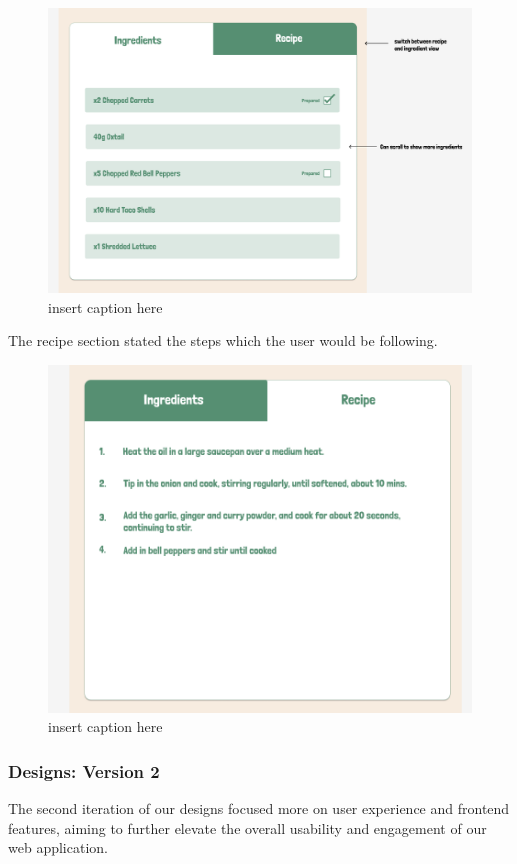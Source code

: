 \documentclass{article}
\begin{document}
\begin{figure}[htbp]
  \includegraphics[width=1.0\textwidth]{assets/Version 1 Recipe Switcher ingredients.png}
  \centering
  \caption{insert caption here}
\end{figure}

The recipe section stated the steps which the user would be following.

\begin{figure}[htbp]
  \includegraphics[width=1.0\textwidth]{assets/Version 1 Recipe Switcher recipe.png}
  \centering
  \caption{insert caption here}
\end{figure}

\subsubsection{Designs: Version 2}
The second iteration of our designs focused more on user experience and frontend features, aiming to further elevate the overall usability and engagement of our web application.
\end{document}
